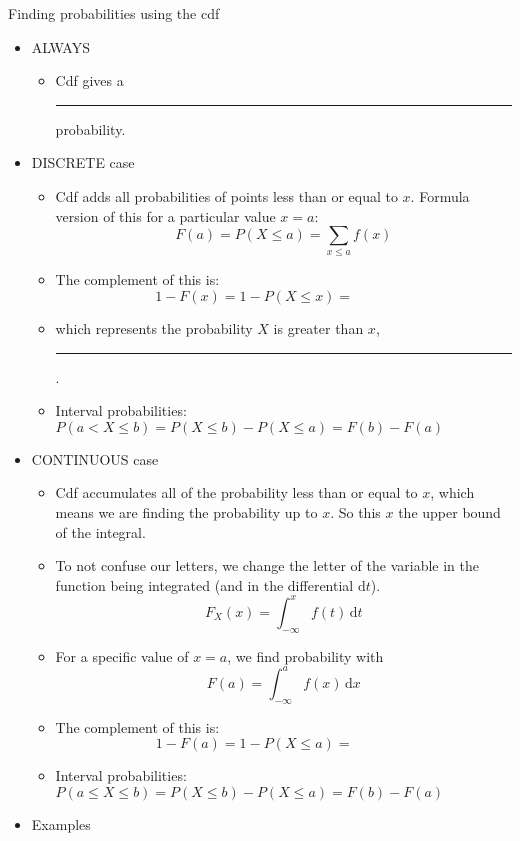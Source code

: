 \documentclass{article}
\newcommand{\blankul}[1]{\rule[-1.5mm]{#1}{0.15mm}}	%
\newcommand{\integral}[4]{\displaystyle \int_{#1}^{#2} #3 \,\mathrm{d} #4}		%
\begin{document}
Finding probabilities using the cdf\bigskip
\begin{itemize}
    \item ALWAYS
    \begin{itemize}
        \item Cdf gives a \blankul{2cm} probability.
    \end{itemize}\bigskip
    \item DISCRETE case
    \begin{itemize}
        \item Cdf adds all probabilities of points less than or equal to $x$. Formula version of this for a particular value $x = a$:
        \[F(a) = P(X \le a) = \sum_{x \le a} f(x)\]
        \item The complement of this is:
        \[1 - F(x) = 1 - P(X \le x) = \hspace{50pt}\]
        \item[] which represents the probability $X$ is greater than $x$, \blankul{2cm}.\bigskip
        \item Interval probabilities: $P(a < X \le b) = P(X \le b) - P(X \le a) = F(b) - F(a)$\vspace{30pt}
    \end{itemize}\bigskip
    \item CONTINUOUS case
    \begin{itemize}
        \item Cdf accumulates all of the probability less than or equal to $x$, which means we are finding the probability up to $x$. So this $x$ the upper bound of the integral.
        \item[] To not confuse our letters, we change the letter of the variable  in the function being integrated (and in the differential $\text{d}t$).
        \[F_X(x) = \integral{-\infty}{x}{f(t)}{t}\]
        \item For a specific value of $x = a$, we find probability with
        \[F(a) = \integral{-\infty}{a}{f(x)}{x}\]
        \item The complement of this is:
        \[1 - F(a) = 1 - P(X \le a) = \hspace{50pt}\]
        \item Interval probabilities: $P(a \le X \le b) = P(X \le b) - P(X \le a) = F(b) - F(a)$
    \end{itemize}\vspace{20pt}
    \item Examples

\end{itemize}
\end{document}
